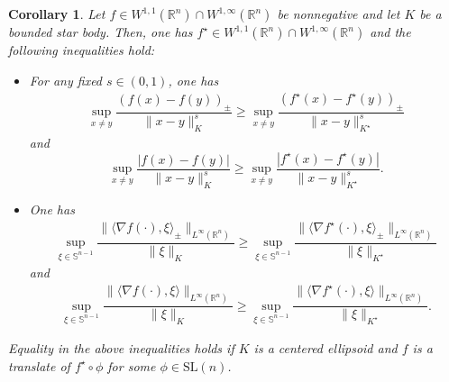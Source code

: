 \documentclass[11pt, reqno]{article}
\newtheorem{corollary}[theorem]{Corollary}
\theoremstyle{definition}
\numberwithin{equation}{section}
\newtheorem{remark}[theorem]{Remark}
\newcommand{\R}{\mathbb{R}}
\newcommand{\Sphere}{\mathbb{S}^{n - 1}}
\newcommand{\dila}{\mathscr{d}}
\begin{document}
\begin{corollary}\label{prop.PS-sup}
	Let $f \in W^{1, 1}(\R^n) \cap W^{1, \infty}(\R^n)$ be nonnegative and let
     $K$ be a bounded star body.
	Then, one has $f^\star \in W^{1, 1}(\R^n) \cap W^{1, \infty}(\R^n)$ and the following inequalities hold:
	\begin{itemize}
		\item[(i)] For any fixed $s \in (0, 1)$, one has
			\begin{align*}
				\sup_{x \neq y} \dfrac{(f(x) - f(y))_\pm}{\| x - y \|_K^s} \geq \sup_{x \neq y} \dfrac{(f^\star(x) - f^\star(y))_\pm}{\| x - y \|_{K^\star}^s}
			\end{align*}
			and
			\begin{equation}\label{PS-Holder}
				\sup_{x \neq y} \dfrac{|f(x) - f(y)|}{\| x - y \|_K^s} \geq \sup_{x \neq y} \dfrac{|f^\star(x) - f^\star(y)|}{\| x - y \|_{K^\star}^s}.
			\end{equation}
		
		\item[(ii)] One has
			\begin{align*}
				\sup_{\xi \in \Sphere} \dfrac{\| \langle \nabla f(\cdot), \xi \rangle_\pm \|_{L^\infty(\R^n)} }{\| \xi \|_K} \geq \sup_{\xi \in \Sphere} \dfrac{\| \langle \nabla f^\star(\cdot), \xi \rangle_\pm \|_{L^\infty(\R^n)} }{\| \xi \|_{K^\star}}
			\end{align*}
		and 
			\begin{align*}
				\sup_{\xi \in \Sphere} \dfrac{\| \langle \nabla f(\cdot), \xi \rangle \|_{L^\infty(\R^n)} }{\| \xi \|_K} \geq \sup_{\xi \in \Sphere} \dfrac{\| \langle \nabla f^\star(\cdot), \xi \rangle \|_{L^\infty(\R^n)} }{\| \xi \|_{K^\star}}.
			\end{align*}
	\end{itemize}

Equality in the above inequalities holds if $K$ is a centered ellipsoid and $f$ is a translate of $f^\star \circ \phi$ for some $\phi \in \mathrm{SL}(n)$.
\end{corollary}
%
%
\end{document}
